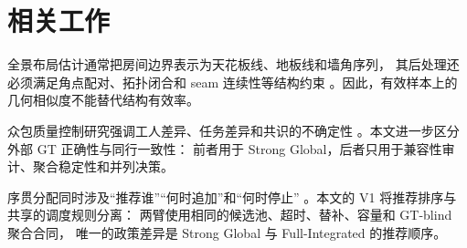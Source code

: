 \section{相关工作}

全景布局估计通常把房间边界表示为天花板线、地板线和墙角序列，
其后处理还必须满足角点配对、拓扑闭合和 seam 连续性等结构约束
\cite{sun2019horizonnet}。因此，有效样本上的几何相似度不能替代结构有效率。

众包质量控制研究强调工人差异、任务差异和共识的不确定性
\cite{dumitrache2018crowdtruth}。本文进一步区分外部 GT 正确性与同行一致性：
前者用于 Strong Global，后者只用于兼容性审计、聚合稳定性和并列决策。

序贯分配同时涉及“推荐谁”“何时追加”和“何时停止”
\cite{li2017optimalstopping}。本文的 V1 将推荐排序与共享的调度规则分离：
两臂使用相同的候选池、超时、替补、容量和 GT-blind 聚合合同，
唯一的政策差异是 Strong Global 与 Full-Integrated 的推荐顺序。

